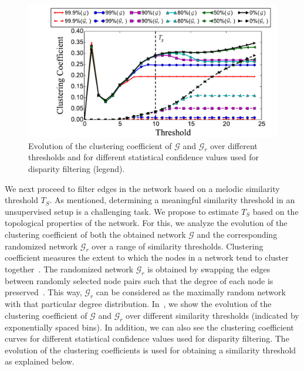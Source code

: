 \begin{figure}
	\begin{center}
		\includegraphics[width=\figSizeHundred]{ch06_patterns/figures/Characterization/CC_Curves_shrunk.pdf}
	\end{center}
	\caption{Evolution of the clustering coefficient of $\mathcal{G}$ and $\mathcal{G}_r$ over different thresholds and for different statistical confidence values used for disparity filtering (legend).}
	\label{fig:cc_curve_pattern_characterization}
\end{figure}

We next proceed to filter edges in the network based on a melodic similarity threshold $T_S$. As mentioned, determining a meaningful similarity threshold in an unsupervised setup is a challenging task. We propose to estimate $T_S$ based on the topological properties of the network. For this, we analyze the evolution of the clustering coefficient of both the obtained network $\mathcal{G}$ and the corresponding randomized network $\mathcal{G}_r$ over a range of similarity thresholds. Clustering coefficient measures the extent to which the nodes in a network tend to cluster together~\citep{newman2003structure}. The randomized network $\mathcal{G}_r$ is obtained by swapping the edges between randomly selected node pairs such that the degree of each node is preserved~\citep{maslov2002specificity}. This way, $\mathcal{G}_r$ can be considered as the maximally random network with that particular degree distribution. In~, we show the evolution of the clustering coefficient of $\mathcal{G}$ and $\mathcal{G}_r$ over different similarity thresholds (indicated by exponentially spaced bins). In addition, we can also see the clustering coefficient curves for different statistical confidence values used for disparity filtering. The evolution of the clustering coefficients is used for obtaining a similarity threshold as explained below.

